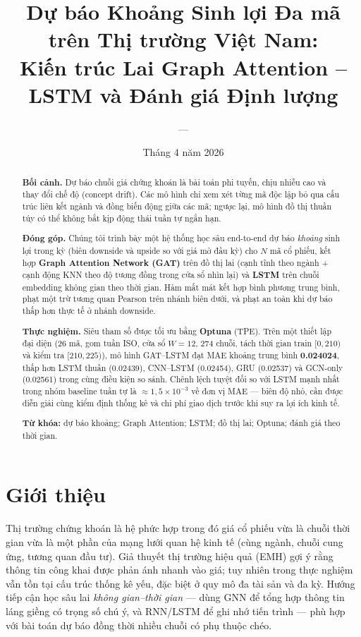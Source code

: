 \documentclass[12pt,a4paper]{article}
\title{\textcolor{hdr}{\textbf{Dự báo Khoảng Sinh lợi Đa mã trên Thị trường Việt Nam:\\
Kiến trúc Lai Graph Attention -- LSTM và Đánh giá Định lượng}}}
\author{---}
\date{Tháng 4 năm 2026}
\begin{document}
\maketitle

\begin{abstract}
\noindent
\textbf{Bối cảnh.} Dự báo chuỗi giá chứng khoán là bài toán phi tuyến, chịu nhiễu cao và thay đổi chế độ (concept drift). Các mô hình chỉ xem xét từng mã độc lập bỏ qua cấu trúc liên kết ngành và đồng biến động giữa các mã; ngược lại, mô hình đồ thị thuần túy có thể không bắt kịp động thái tuần tự ngắn hạn.

\textbf{Đóng góp.} Chúng tôi trình bày một hệ thống học sâu end-to-end dự báo \emph{khoảng} sinh lợi trong kỳ (biên downside và upside so với giá mở đầu kỳ) cho $N$ mã cổ phiếu, kết hợp \textbf{Graph Attention Network (GAT)} trên đồ thị lai (cạnh tĩnh theo ngành + cạnh động KNN theo độ tương đồng trong cửa sổ nhìn lại) và \textbf{LSTM} trên chuỗi embedding không gian theo thời gian. Hàm mất mát kết hợp bình phương trung bình, phạt một trừ tương quan Pearson trên nhánh biên dưới, và phạt an toàn khi dự báo thấp hơn thực tế ở nhánh downside.

\textbf{Thực nghiệm.} Siêu tham số được tối ưu bằng \textbf{Optuna} (TPE). Trên một thiết lập đại diện (26 mã, gom tuần ISO, cửa sổ $W{=}12$, 274 chuỗi, tách thời gian train $[0,210)$ và kiểm tra $[210,225)$), mô hình GAT--LSTM đạt MAE khoảng trung bình \textbf{0.024024}, thấp hơn LSTM thuần (0.02439), CNN--LSTM (0.02454), GRU (0.02537) và GCN-only (0.02561) trong cùng điều kiện so sánh. Chênh lệch tuyệt đối so với LSTM mạnh nhất trong nhóm baseline tuần tự là $\approx 1{,}5\times 10^{-3}$ về đơn vị MAE --- biên độ nhỏ, cần được diễn giải cùng kiểm định thống kê và chi phí giao dịch trước khi suy ra lợi ích kinh tế.

\textbf{Từ khóa:} dự báo khoảng; Graph Attention; LSTM; đồ thị lai; Optuna; đánh giá theo thời gian.
\end{abstract}

\tableofcontents
\newpage

\section{Giới thiệu}

Thị trường chứng khoán là hệ phức hợp trong đó giá cổ phiếu vừa là chuỗi thời gian vừa là một phần của mạng lưới quan hệ kinh tế (cùng ngành, chuỗi cung ứng, tương quan đầu tư). Giả thuyết thị trường hiệu quả (EMH) gợi ý rằng thông tin công khai được phản ánh nhanh vào giá; tuy nhiên trong thực nghiệm vẫn tồn tại cấu trúc thống kê yếu, đặc biệt ở quy mô đa tài sản và đa kỳ. Hướng tiếp cận học sâu lai \emph{không gian--thời gian} --- dùng GNN để tổng hợp thông tin láng giềng có trọng số chú ý, và RNN/LSTM để ghi nhớ tiến trình --- phù hợp với bài toán dự báo đồng thời nhiều chuỗi có phụ thuộc chéo.
\end{document}
